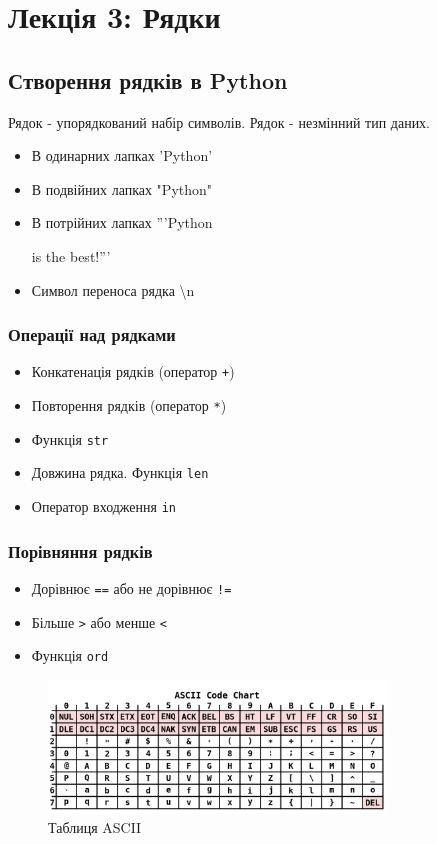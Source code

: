 \section*{Лекція 3: Рядки}
\subsection{Створення рядків в Python} 
\begin{frame}
Рядок - упорядкований набір символів. Рядок - незмінний тип даних.
\begin{itemize}
  \item В одинарних лапках 'Python'
  \item В подвійних лапках "Python"
  \item 
  В потрійних лапках '''Python
  
  is the best!'''
  \item Символ переноса рядка \textbackslash n
 \end{itemize}

\end{frame}

\begin{frame}
\frametitle{Операції над рядками}
\begin{itemize}
  \item Конкатенація рядків (оператор \texttt{+})
  \item Повторення рядків (оператор \texttt{*})
  \item Функція \texttt{str}
  \item Довжина рядка. Функція \texttt{len}
  \item Оператор входження \texttt{in}
 \end{itemize}

\end{frame}

\begin{frame}
\frametitle{Порівняння рядків}
\begin{itemize}
  \item Дорівнює \texttt{==} або не дорівнює \texttt{!=}
  \item Більше \texttt{>} або менше \texttt{<}
  \item Функція \texttt{ord}
\end{itemize}
\begin{figure}
\begin{center}
 \includegraphics[width=0.8\textwidth]{pictures/ASCII-Table.png}
\caption{Таблиця ASCII}
\label{ASCII-Table} 
\end{center}
\end{figure}
\end{frame}

